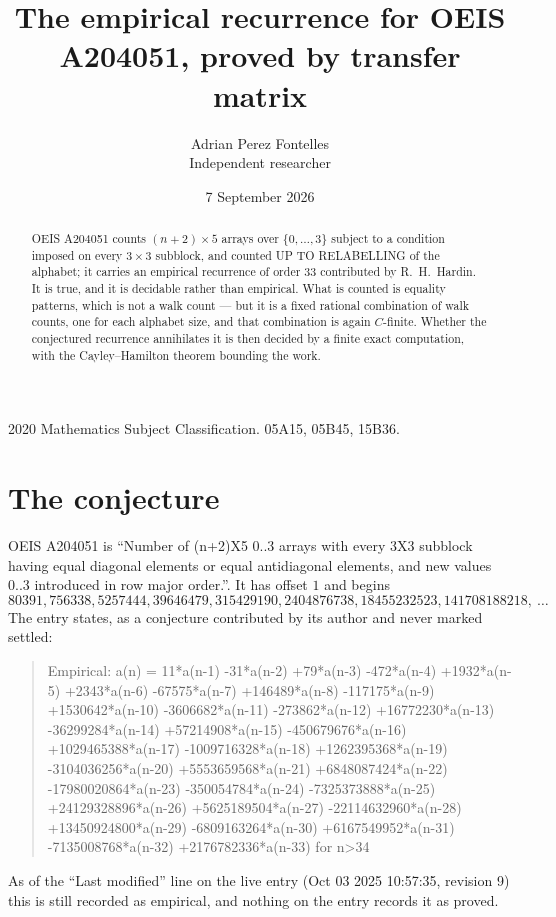 \documentclass[11pt,a4paper]{article}
\title{The empirical recurrence for OEIS A204051, proved by transfer matrix}
\author{Adrian Perez Fontelles\\ \small Independent researcher}
\date{7 September 2026}
\theoremstyle{plain}
\theoremstyle{definition}
\begin{document}
\maketitle

\begin{abstract}
OEIS A204051 counts $(n+2)\times5$ arrays over $\{0,\dots,3\}$ subject to a condition imposed on
every $3\times3$ subblock, and counted UP TO RELABELLING of the
alphabet; it carries an empirical recurrence of order $33$ contributed by
R.~H.~Hardin. It is true, and it is decidable rather than empirical. What is counted is
equality patterns, which is not a walk count --- but it is a fixed rational combination of
walk counts, one for each alphabet size, and that combination is again $C$-finite. Whether the
conjectured recurrence annihilates it is then decided by a finite exact computation, with the
Cayley--Hamilton theorem bounding the work.
\end{abstract}

\noindent\small 2020 Mathematics Subject Classification. 05A15, 05B45, 15B36.\normalsize

\section{The conjecture}

OEIS A204051 is ``Number of (n+2)X5 0..3 arrays with every 3X3 subblock having equal diagonal elements or equal antidiagonal elements, and new values 0..3 introduced in row major order.''. It has offset $1$ and begins
\[
80391, 756338, 5257444, 39646479, 315429190, 2404876738, 18455232523, 141708188218,\ \dots
\]
The entry states, as a conjecture contributed by its author and never marked settled:
\begin{quote}
Empirical: a(n) = 11*a(n-1) -31*a(n-2) +79*a(n-3) -472*a(n-4) +1932*a(n-5) +2343*a(n-6) -67575*a(n-7) +146489*a(n-8) -117175*a(n-9) +1530642*a(n-10) -3606682*a(n-11) -273862*a(n-12) +16772230*a(n-13) -36299284*a(n-14) +57214908*a(n-15) -450679676*a(n-16) +1029465388*a(n-17) -1009716328*a(n-18) +1262395368*a(n-19) -3104036256*a(n-20) +5553659568*a(n-21) +6848087424*a(n-22) -17980020864*a(n-23) -350054784*a(n-24) -7325373888*a(n-25) +24129328896*a(n-26) +5625189504*a(n-27) -22114632960*a(n-28) +13450924800*a(n-29) -6809163264*a(n-30) +6167549952*a(n-31) -7135008768*a(n-32) +2176782336*a(n-33) for n>34
\end{quote}
As of the ``Last modified'' line on the live entry (Oct 03 2025 10:57:35, revision 9) this is still
recorded as empirical, and nothing on the entry records it as proved.
\end{document}
